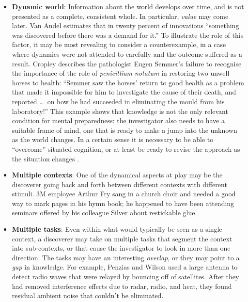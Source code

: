 \begin{itemize}
\item \textbf{Dynamic world}: Information about the world develops
  over time, and is not presented as a complete, consistent whole.  In
  particular, \emph{value} may come later.  Van Andel
  \citeyear[p. 643]{van1994anatomy} estimates that in twenty percent
  of innovations ``something was discovered before there was a demand
  for it.''  To illustrate the role of this factor, it may be most
  revealing to consider a counterexample, in a case where dynamics
  were not attended to carefully and the outcome suffered as a result.
  Cropley \citeyear{cropley2006praise} describes the pathologist Eugen
  Semmer's failure to recognise the importance of the role of
  \emph{penicillium notatum} in restoring two unwell horses to health:
  ``Semmer saw the horses' return to good health as a problem that
  made it impossible for him to investigate the cause of their death,
  and reported \ldots\ on how he had succeeded in eliminating the
  mould from his laboratory!''  This example shows that knowledge is
  not the only relevant condition for mental preparedness: the
  investigator also needs to have a suitable frame of mind, one that
  is ready to make a jump into the unknown as the world changes.  In a
  certain sense it is necessary to be able to ``overcome'' situated
  cognition, or at least be ready to revise the approach as the
  situation changes \cite{bereiter1997situated}.
\end{itemize}

\begin{itemize}
\item \textbf{Multiple contexts}: One of the dynamical aspects at play
  may be the discoverer going back and forth between different
  contexts with different stimuli.  3M employee Arthur Fry sang in a
  church choir and needed a good way to mark pages in his hymn book;
  he happened to have been attending seminars offered by his colleague
  Silver about restickable glue.
\end{itemize}

\begin{itemize}
\item \textbf{Multiple tasks}: Even within what would typically be
  seen as a single context, a discoverer may take on multiple tasks
  that segment the context into sub-contexts, or that cause the
  investigator to look in more than one direction.  The tasks may have
  an interesting \emph{overlap}, or they may point to a \emph{gap} in
  knowledge.  For example, Penzias and Wilson used a
  large antenna to detect radio waves that were relayed by bouncing
  off of satellites.  After they had removed interference effects due
  to radar, radio, and heat, they found residual ambient noise that
  couldn't be eliminated.
\end{itemize}

